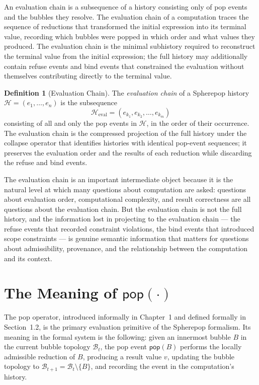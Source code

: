 \documentclass[12pt,openany]{book}
\theoremstyle{plain}
\theoremstyle{definition}
\newtheorem{definition}[theorem]{Definition}
\theoremstyle{remark}
\newcommand{\spop}[1]{\mathsf{pop}\!\left(#1\right)}
\newcommand{\shist}{\mathcal{H}}
\begin{document}
An evaluation chain is a subsequence of a history consisting only of pop events and the bubbles they resolve. The evaluation chain of a computation traces the sequence of reductions that transformed the initial expression into its terminal value, recording which bubbles were popped in which order and what values they produced. The evaluation chain is the minimal subhistory required to reconstruct the terminal value from the initial expression; the full history may additionally contain refuse events and bind events that constrained the evaluation without themselves contributing directly to the terminal value.

\begin{definition}[Evaluation Chain]
The \emph{evaluation chain} of a Spherepop history $\shist = (e_1, \ldots, e_n)$ is the subsequence
\[
  \shist_{\mathrm{eval}} = (e_{k_1}, e_{k_2}, \ldots, e_{k_m})
\]
consisting of all and only the pop events in $\shist$, in the order of their occurrence. The evaluation chain is the compressed projection of the full history under the collapse operator that identifies histories with identical pop-event sequences; it preserves the evaluation order and the results of each reduction while discarding the refuse and bind events.
\end{definition}

The evaluation chain is an important intermediate object because it is the natural level at which many questions about computation are asked: questions about evaluation order, computational complexity, and result correctness are all questions about the evaluation chain. But the evaluation chain is not the full history, and the information lost in projecting to the evaluation chain — the refuse events that recorded constraint violations, the bind events that introduced scope constraints — is genuine semantic information that matters for questions about admissibility, provenance, and the relationship between the computation and its context.

\section{The Meaning of \texorpdfstring{$\spop{\cdot}$}{pop}}

The pop operator, introduced informally in Chapter~1 and defined formally in Section~1.2, is the primary evaluation primitive of the Spherepop formalism. Its meaning in the formal system is the following: given an innermost bubble $B$ in the current bubble topology $\mathcal{B}_t$, the pop event $\spop{B}$ performs the locally admissible reduction of $B$, producing a result value $v$, updating the bubble topology to $\mathcal{B}_{t+1} = \mathcal{B}_t \setminus \{B\}$, and recording the event in the computation's history.
\end{document}
